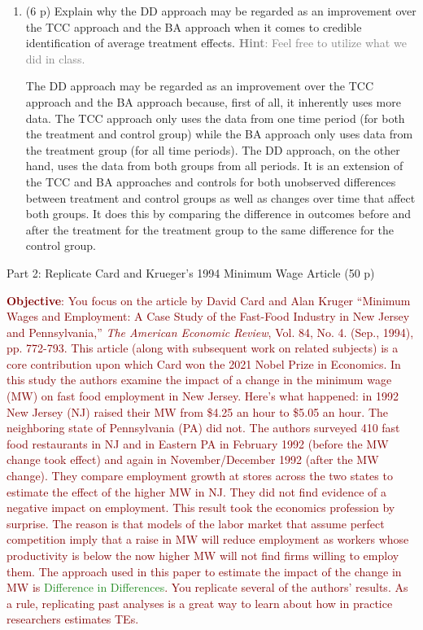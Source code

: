 \documentclass[
]{article}
\begin{document}
\begin{enumerate}
\def\labelenumi{\arabic{enumi}.}
\setcounter{enumi}{7}
\item
  (6 p) Explain why the DD approach may be regarded as an improvement
  over the TCC approach and the BA approach when it comes to credible
  identification of average treatment effects.
  \textcolor{gray}{\textbf{Hint}: Feel free to utilize what we did in class.}

  The DD approach may be regarded as an improvement over the TCC
  approach and the BA approach because, first of all, it inherently uses
  more data. The TCC approach only uses the data from one time period
  (for both the treatment and control group) while the BA approach only
  uses data from the treatment group (for all time periods). The DD
  approach, on the other hand, uses the data from both groups from all
  periods. It is an extension of the TCC and BA approaches and controls
  for both unobserved differences between treatment and control groups
  as well as changes over time that affect both groups. It does this by
  comparing the difference in outcomes before and after the treatment
  for the treatment group to the same difference for the control group.
  \newpage
\end{enumerate}

\begin{center}
{\LARGE Part 2: Replicate Card and Krueger's 1994 Minimum Wage Article (50 p)}
\end{center}

\noindent \textcolor{Maroon}{\textbf{Objective}: You focus on the article by David Card and Alan Kruger ``Minimum Wages and Employment: A Case Study of the Fast-Food Industry in New Jersey and Pennsylvania,'' \textit{The American Economic Review}, Vol. 84, No. 4. (Sep., 1994), pp. 772-793. This article (along with subsequent work on related subjects) is a core contribution upon which Card won the 2021 Nobel Prize in Economics. In this study the authors examine the impact of a change in the minimum wage (MW) on fast food employment in New Jersey. Here's what happened: in 1992 New Jersey (NJ) raised their MW from \$4.25 an hour to \$5.05 an hour. The neighboring state of Pennsylvania (PA) did not. The authors surveyed 410 fast food restaurants in NJ and in Eastern PA in February 1992 (before the MW change took effect) and again in November/December 1992 (after the MW change). They compare employment growth at stores across the two states to estimate the effect of the higher MW in NJ. They did not find evidence of a negative impact on employment. This result took the economics profession by surprise. The reason is that models of the labor market that assume perfect competition imply that a raise in MW will reduce employment as workers whose productivity is below the now higher MW will not find firms willing to employ them. The approach used in this paper to estimate the impact of the change in MW is \textcolor{ForestGreen}{Difference in Differences}. You replicate several of the authors' results. As a rule, replicating past analyses is a great way to learn about how in practice researchers estimates TEs.}
\end{document}
